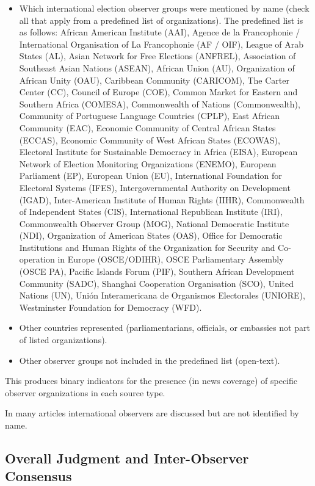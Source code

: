\documentclass[USletter,12pt, titlepage]{article} %
\begin{document}
\begin{itemize}
    \item Which international election observer groups were mentioned by name (check all that apply from a predefined list of organizations). The predefined list is as follows: African American Institute (AAI), Agence de la Francophonie / International Organisation of La Francophonie (AF / OIF), League of Arab States (AL), Asian Network for Free Elections (ANFREL), Association of Southeast Asian Nations (ASEAN), African Union (AU), Organization of African Unity (OAU), Caribbean Community (CARICOM), The Carter Center (CC), Council of Europe (COE), Common Market for Eastern and Southern Africa (COMESA), Commonwealth of Nations (Commonwealth), Community of Portuguese Language Countries (CPLP), East African Community (EAC), Economic Community of Central African States (ECCAS), Economic Community of West African States (ECOWAS), Electoral Institute for Sustainable Democracy in Africa (EISA), European Network of Election Monitoring Organizations (ENEMO), European Parliament (EP), European Union (EU), International Foundation for Electoral Systems (IFES), Intergovernmental Authority on Development (IGAD), Inter-American Institute of Human Rights (IIHR), Commonwealth of Independent States (CIS), International Republican Institute (IRI), Commonwealth Observer Group (MOG), National Democratic Institute (NDI), Organization of American States (OAS), Office for Democratic Institutions and Human Rights of the Organization for Security and Co-operation in Europe (OSCE/ODIHR), OSCE Parliamentary Assembly (OSCE PA), Pacific Islands Forum (PIF), Southern African Development Community (SADC), Shanghai Cooperation Organisation (SCO), United Nations (UN), Unión Interamericana de Organismos Electorales (UNIORE), Westminster Foundation for Democracy (WFD).
    \item Other countries represented (parliamentarians, officials, or embassies not part of listed organizations).
    \item Other observer groups not included in the predefined list (open-text).
\end{itemize}

This produces binary indicators for the presence (in news coverage) of specific observer organizations in each source type. 

In many articles international observers are discussed but are not identified by name.

\subsection{Overall Judgment and Inter-Observer Consensus}
\end{document}
